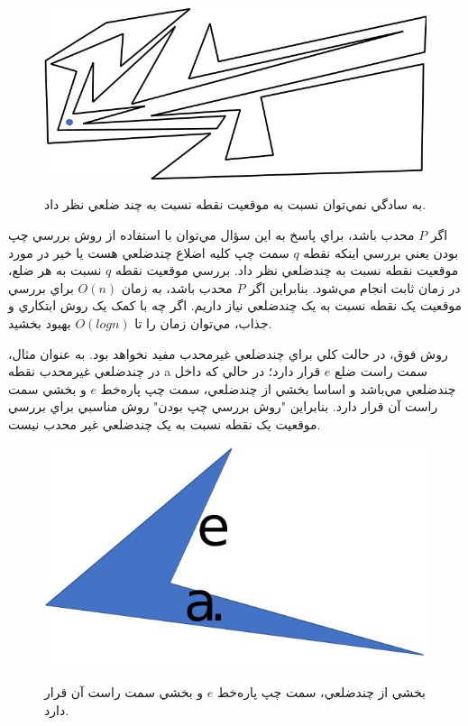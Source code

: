 \documentclass{book}
\begin{document}
\begin{figure}[h!]
    \begin{center}
        \includegraphics[width=\linewidth]{pimp.jpg}
        \label{pimp}
        \caption{به سادگي نمي‌توان نسبت به موقعيت نقطه نسبت به چند ضلعي نظر داد.}
    \end{center}
\end{figure}

اگر $P$ محدب باشد، براي پاسخ به اين سؤال مي‌توان با استفاده از روش بررسي چپ بودن يعني بررسي اينکه نقطه $q$ سمت چپ کليه اضلاع چندضلعي هست يا خير در مورد موقعيت نقطه نسبت به چندضلعي نظر داد. بررسي موقعيت نقطه $q$ نسبت به هر ضلع، در زمان ثابت انجام مي‌شود. بنابراين اگر $P$ محدب باشد، به زمان $O(n)$ براي بررسي موقعيت يک نقطه نسبت به يک چندضلعي نياز داريم. اگر چه با کمک يک روش ابتکاري و جذاب، مي‌توان زمان را تا $O(logn)$ بهبود بخشيد.

روش فوق، در حالت کلي براي چندضلعي غيرمحدب مفيد نخواهد بود. به عنوان مثال، در چندضلعي غيرمحدب نقطه a سمت راست ضلع $e$ قرار دارد؛ در حالي که داخل چندضلعي مي‌باشد و اساسا بخشي از چندضلعي، سمت چپ پاره‌خط $e$ و بخشي سمت راست آن قرار دارد. بنابراين "روش بررسي چپ بودن" روش مناسبي براي بررسي موقعيت يک نقطه نسبت به يک چندضلعي غير محدب نيست.

\begin{figure}[h!]
    \begin{center}
        \includegraphics[width=\linewidth]{not_hull.jpg}
        \label{not_hull}
        \caption{بخشي از چندضلعي، سمت چپ پاره‌خط $e$ و بخشي سمت راست آن قرار دارد.}
    \end{center}
\end{figure}
\end{document}
